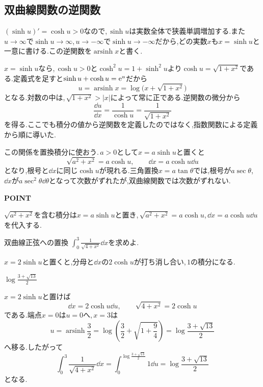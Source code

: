 \subsection{双曲線関数の逆関数}

$(\sinh u)'=\cosh u>0$なので,\,$\sinh u$は実数全体で狭義単調増加する.また$u\to\infty$で$\sinh u\to\infty$,\,$u\to-\infty$で$\sinh u\to-\infty$だから,どの実数$x$も$x=\sinh u$と一意に書ける.この逆関数を$\operatorname{arsinh}x$と書く.

$x=\sinh u$なら,\,$\cosh u>0$と$\cosh^2u=1+\sinh^2u$より$\cosh u=\sqrt{1+x^2}$である.定義式を足すと$\sinh u+\cosh u=\mathrm{e}^u$だから
\begin{equation}\label{式:逆双曲線正弦}
u=\operatorname{arsinh}x=\log\bigl(x+\sqrt{1+x^2}\bigr)
\end{equation}
となる.対数の中は,\,$\sqrt{1+x^2}>|x|$によって常に正である.逆関数の微分から
\[
\frac{\dd u}{\dd x}=\frac1{\cosh u}
=\frac1{\sqrt{1+x^2}}
\]
を得る.ここでも積分の値から逆関数を定義したのではなく,指数関数による定義から順に導いた.

この関係を置換積分に使おう.\,$a>0$として$x=a\sinh u$と置くと
\[
\sqrt{a^2+x^2}=a\cosh u,\qquad
\dd x=a\cosh u\dd u
\]
となり,根号と$\dd x$に同じ$\cosh u$が現れる.三角置換$x=a\tan\theta$では,根号が$a\sec\theta$,\,$\dd x$が$a\sec^2\theta\dd\theta$となって次数がずれたが,双曲線関数では次数がずれない.

\begin{bookpoint}
\textbf{POINT}\par
$\sqrt{a^2+x^2}$を含む積分は$x=a\sinh u$と置き,\,$\sqrt{a^2+x^2}=a\cosh u$,\,$\dd x=a\cosh u\dd u$を代入する.
\end{bookpoint}

\begin{example}{双曲線正弦への置換}
$\int_0^3\frac1{\sqrt{4+x^2}}\dd x$を求めよ.
\end{example}

$x=2\sinh u$と置くと,分母と$\dd x$の$2\cosh u$が打ち消し合い,\,$1$の積分になる.

$\log\frac{3+\sqrt{13}}2$

$x=2\sinh u$と置けば
\[
\dd x=2\cosh u\dd u,\qquad
\sqrt{4+x^2}=2\cosh u
\]
である.端点$x=0$は$u=0$へ,\,$x=3$は
\[
u=\operatorname{arsinh}\frac32
=\log\left(\frac32+\sqrt{1+\frac94}\right)
=\log\frac{3+\sqrt{13}}2
\]
へ移る.したがって
\[
\int_0^3\frac1{\sqrt{4+x^2}}\dd x
=\int_0^{\log\frac{3+\sqrt{13}}2}1\dd u
=\log\frac{3+\sqrt{13}}2
\]
となる.


